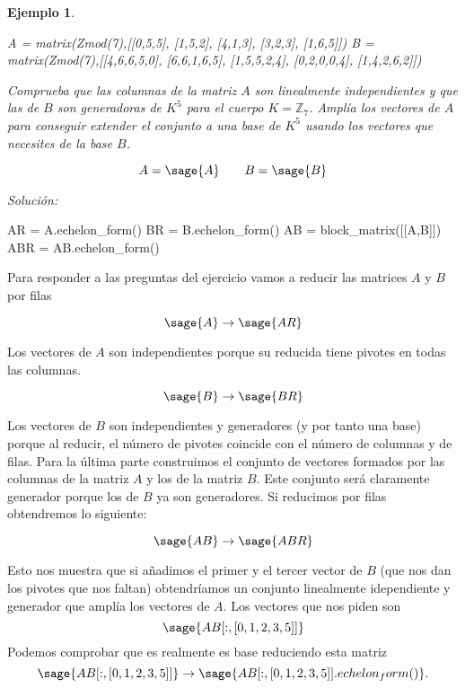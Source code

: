 \documentclass{amsart}
\newtheorem{ejem}{Ejemplo}
\begin{document}
\begin{ejem}

\begin{sagecode}
A = matrix(Zmod(7),[[0,5,5],
[1,5,2],
[4,1,3],
[3,2,3],
[1,6,5]])
B = matrix(Zmod(7),[[4,6,6,5,0],
[6,6,1,6,5],
[1,5,5,2,4],
[0,2,0,0,4],
[1,4,2,6,2]])
\end{sagecode}

Comprueba que las columnas de la matriz $A$ son linealmente independientes y
que las de $B$ son generadoras de $K^5$ para el cuerpo $K = {\mathbb Z}_7$.
Amplía los vectores de $A$ para conseguir extender el conjunto a una base 
de $K^5$ usando los vectores que necesites de la base $B$.

$$ A = \sage{A} \qquad B = \sage{B} $$
\end{ejem}

{\it Solución:}

\begin{sageblock}
AR = A.echelon_form()
BR = B.echelon_form()
AB = block_matrix([[A,B]])
ABR = AB.echelon_form()
\end{sageblock}

Para responder a las preguntas del ejercicio vamos a reducir las matrices
$A$ y $B$ por filas

$$ \sage{A} \to \sage{AR}$$

Los vectores de $A$ son independientes porque su reducida tiene pivotes 
en todas las columnas.

$$ \sage{B} \to \sage{BR}$$

Los vectores de $B$ son independientes y generadores (y por tanto una base) 
porque al reducir, el número de pivotes coincide con el número de columnas y 
de filas. 
Para la última parte construimos el conjunto de vectores formados por las
columnas de la matriz $A$ y los de la matriz $B$. Este conjunto será 
claramente generador porque los de $B$ ya son generadores. Si reducimos por
filas obtendremos lo siguiente:

$$ \sage{AB} \to \sage{ABR} $$

Esto nos muestra que si añadimos el primer y el tercer vector de $B$ (que nos
dan los pivotes que nos faltan) obtendríamos un conjunto linealmente 
idependiente y generador que amplía los vectores de $A$. Los vectores que
nos piden son 
$$ \sage{AB[:,[0,1,2,3,5]]}$$
Podemos comprobar que es realmente es base reduciendo esta matriz
$$ 
\sage{AB[:,[0,1,2,3,5]]} \to 
\sage{AB[:,[0,1,2,3,5]].echelon_form()}. 
$$

\end{document}
